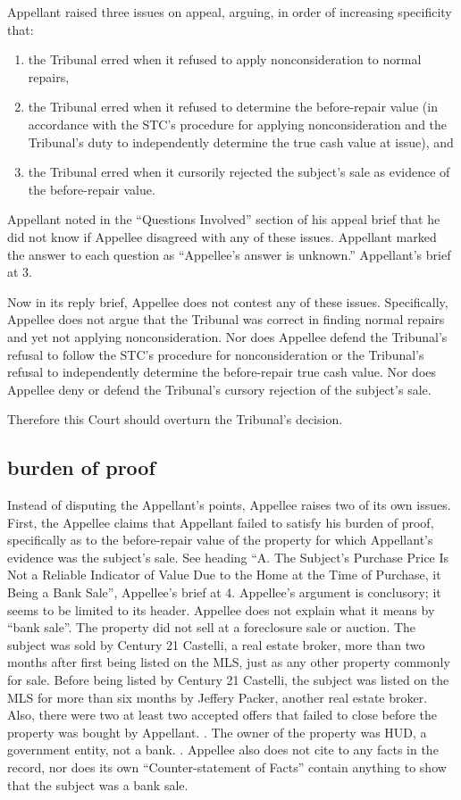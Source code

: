 \documentclass[12pt,\documentclassflag]{michiganCourtOfAppealsBrief}
\begin{document}
Appellant raised three issues on appeal, arguing, in order of increasing specificity that:

\begin{enumerate}
\item the Tribunal erred when it refused to apply nonconsideration to normal repairs,
\item the Tribunal erred when it refused to determine the before-repair value (in accordance with the STC's procedure for applying nonconsideration and the Tribunal's duty to independently determine the true cash value at issue), and
\item the Tribunal erred when it cursorily rejected the subject's sale as evidence of the before-repair value.
\end{enumerate}

Appellant noted in the ``Questions Involved'' section of his appeal brief that he did not know if Appellee disagreed with any of these issues. Appellant marked the answer to each question as ``Appellee's answer is unknown.'' Appellant's brief at 3.

Now in its reply brief, Appellee does not contest any of these issues. Specifically, Appellee does not argue that the Tribunal was correct in finding normal repairs and yet not applying nonconsideration. Nor does Appellee defend the Tribunal's refusal to follow the STC's procedure for nonconsideration or the Tribunal's refusal to independently determine the before-repair true cash value. Nor does Appellee deny or defend the Tribunal's cursory rejection of the subject's sale.

Therefore this Court should overturn the Tribunal's decision.

\subsection{burden of proof}

Instead of disputing the Appellant's points, Appellee raises two of its own issues. First, the Appellee claims that Appellant failed to satisfy his burden of proof, specifically as to the before-repair value of the property for which Appellant's evidence was the subject's sale. See heading ``A.  The Subject's Purchase Price Is Not a Reliable Indicator of Value Due to the Home at the Time of Purchase, it Being a Bank Sale'', Appellee's brief at 4. Appellee's argument is conclusory; it seems to be limited to its header. Appellee does not explain what it means by ``bank sale''. The property did not sell at a foreclosure sale or auction. The subject was sold by Century 21 Castelli, a real estate broker, more than two months after first being listed on the MLS, just as any other property commonly for sale. Before being listed by Century 21 Castelli, the subject was listed on the MLS for more than six months by Jeffery Packer, another real estate broker. Also, there were two at least two accepted offers that failed to close before the property was bought by Appellant. \mlsHistory. The owner of the property was HUD, a government entity, not a bank. \mlsListing. Appellee also does not cite to any facts in the record, nor does its own ``Counter-statement of Facts'' contain anything to show that the subject was a bank sale. 
\end{document}
